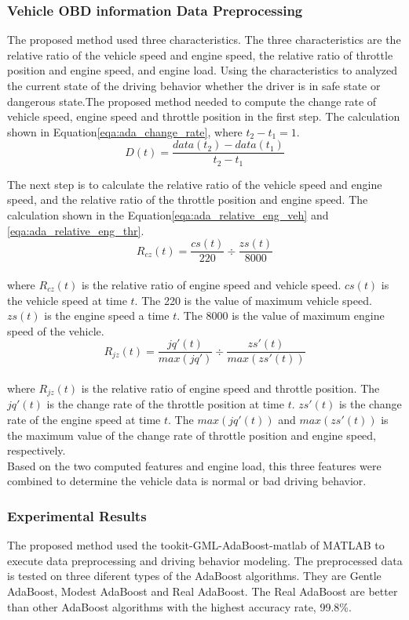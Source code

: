 \subsubsection{Vehicle OBD information Data Preprocessing}
The proposed method used three characteristics. The three characteristics are the relative ratio of the vehicle speed and engine speed, the relative ratio of throttle position and engine speed, and engine load. Using the characteristics to analyzed the current state of the driving behavior whether the driver is in safe state or dangerous state.The proposed method needed to compute the change rate of vehicle speed, engine speed and throttle position in the first step. The calculation shown in Equation\eqref{eqa:ada_change_rate}, where $t_{2} - t_{1} = 1$.\\
\begin{equation}
\label{eqa:ada_change_rate}
D(t) = \dfrac{data(t_{2})-data(t_{1})}{t_{2}-t_{1}}
\end{equation}

The next step is to calculate the relative ratio of the vehicle speed and engine speed, and the relative ratio of the throttle position and engine speed. The calculation shown in the Equation\eqref{eqa:ada_relative_eng_veh} and \eqref{eqa:ada_relative_eng_thr}. \\
\begin{equation}
\label{eqa:ada_relative_eng_veh}
R_{cz}(t) = \dfrac{cs(t)}{220} \div \dfrac{zs(t)}{8000}
\end{equation}
\\
where $R_{cz}(t)$ is the relative ratio of engine speed and vehicle speed. $cs(t)$ is the vehicle speed at time $t$. The 220 is the value of maximum vehicle speed. $zs(t)$ is the engine speed a time $t$. The 8000 is the value of maximum engine speed of the vehicle.\\

\begin{equation}
\label{eqa:ada_relative_eng_thr}
R_{jz}(t) = \dfrac{jq'(t)}{max(jq')} \div \dfrac{zs'(t)}{max(zs'(t))}
\end{equation}
\\
where $R_{jz}(t)$ is the relative ratio of engine speed and throttle position. The $jq'(t)$ is the change rate of the throttle position at time $t$. $zs'(t)$ is the change rate of the engine speed at time $t$. The $max(jq'(t))$ and $max(zs'(t))$ is the maximum value of the change rate of throttle position and engine speed, respectively.\\

Based on the two computed features and engine load, this three features were combined to determine the vehicle data is normal or bad driving behavior.

\subsubsection{Experimental Results}
The proposed method used the tookit-GML-AdaBoost-matlab of MATLAB to execute data preprocessing and driving behavior modeling. The preprocessed data is tested on three diferent types of the AdaBoost algorithms. They are Gentle AdaBoost, Modest AdaBoost and Real AdaBoost. The Real AdaBoost are better than other AdaBoost algorithms with the highest accuracy rate, 99.8\%.